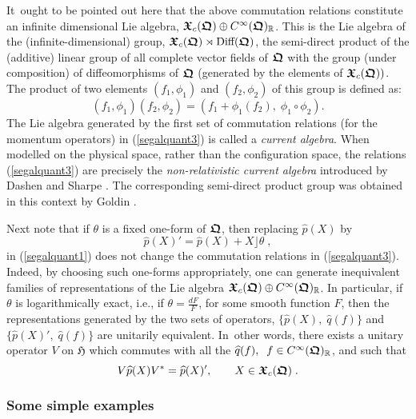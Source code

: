 \documentclass[11pt]{amsart}
\numberwithin{equation}{section}
\theoremstyle{remark}
\newcommand\HH{\mathfrak H}
\newcommand\RR{\mathbb R}
\newcommand{\be}{\begin{equation}}
\newcommand{\en}{\end{equation}}
\newcommand{\bfrakQ}{\mbox{\boldmath $\mathfrak Q$}}
\newcommand{\bfrakX}{\mbox{\boldmath $\mathfrak X$}}
\newcommand{\CinfRQ}{C^\infty(\bfrakQ)_{\RR}}
\begin{document}
It~ought to be pointed out here that the above commutation relations constitute
an  infinite dimensional Lie algebra, $\bfrakX_c (\bfrakQ )\oplus\CinfRQ$. This
is the Lie algebra of the
(infinite-dimensional) group, $\bfrakX_c (\bfrakQ )\rtimes \mbox{\rm Diff}
(\bfrakQ )$, the semi-direct product of the (additive) linear group of all
complete vector fields of $\bfrakQ$ with the group (under composition) of
diffeomorphisms of $\bfrakQ$ (generated by the elements of
$\bfrakX_c(\bfrakQ))$. The product of two elements $(f_1 , \phi_1 )$ and $(f_2
, \phi_2 )$ of this group is defined as:
$$ (f_1 , \phi_1 )(f_2 , \phi_2 ) = (f_1 + \phi_1 (f_2 ) ,\;
 \phi_1 \circ \phi_2 ) .$$
The Lie algebra generated by the first set of commutation relations (for the
momentum operators) in (\ref{segalquant3}) is called a {\em current algebra}.
When modelled on the physical space, rather than the configuration space, the
relations (\ref{segalquant3}) are precisely the {\em non-relativistic current algebra}
introduced by Dashen and Sharpe \cite{bib:DasShar}. The corresponding semi-direct product group
was obtained in this context by Goldin \cite{bib:gol1}.

   Next note that if $\theta$ is a fixed
one-form of $\bfrakQ$, then replacing $\widehat{p}(X)$ by
\be
 \widehat{p}(X)' = \widehat{p}(X) + X\rfloor\theta \;,
\label{equivrep}
\en
in (\ref{segalquant1}) does not change the commutation relations in
(\ref{segalquant3}). Indeed, by choosing such one-forms appropriately, one can
generate inequivalent families of representations of the Lie algebra
$\bfrakX_c (\bfrakQ )\oplus \CinfRQ$. In particular, if $\theta$ is
logarithmically exact, i.e., if $\theta = \frac {dF}F$, for some smooth
function $F$, then the representations  generated by the two sets of operators,
$\{\widehat{p}(X), \; \widehat{q}(f)\}$ and
$\{\widehat{p}(X)', \; \widehat{q}(f)\}$ are unitarily equivalent. In~other
words, there exists a unitary operator $V$ on $\HH$ which commutes with all
the $\widehat{q}(f), \;\; f \in \CinfRQ$, and such that
$$ V \widehat{p}(X)V^* = \widehat{p}(X)' ,
 \qquad X \in \bfrakX_c (\bfrakQ )\; . $$


\subsubsection*{Some simple examples}
\end{document}
